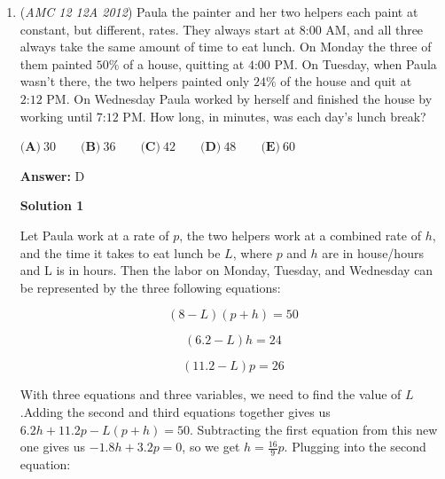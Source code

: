 \begin{enumerate}
 $\frac{-4 + 2\sqrt{19}}{5} \Rightarrow \boxed{\textbf{(D)}}$




\textbf{Solution 3}

Like the previous solutions, we can say that the square is symmetrical with respect to the y-axis.

 \begin{verbatim}
Since CD passes through point (0,1), let C be (-x,1) and D be (x,1)
\end{verbatim}

Point B is $\left(-x, \sqrt{4-x^2}\right)$ and Point A is $\left(x,\sqrt{4-x^2}\right)$. Now, we see that AB = 2x and BC = $\sqrt{4-x^2}$-1

 Setting those two equal, we get the same equation as the previous solutions: $5x^2 +4x -3 = 0$ and then solve the same way.

 
-Conantwiz2023

 


	\item (\textit{AMC 12 12A 2012}) Paula the painter and her two helpers each paint at constant, but different, rates.  They always start at $\text{8:00 AM}$, and all three always take the same amount of time to eat lunch.  On Monday the three of them painted $50\%$ of a house, quitting at $\text{4:00 PM}$.  On Tuesday, when Paula wasn't there, the two helpers painted only $24\%$ of the house and quit at $\text{2:12 PM}$.  On Wednesday Paula worked by herself and finished the house by working until $\text{7:12 PM}$.  How long, in minutes, was each day's lunch break?


 $\textbf{(A)}\ 30 \qquad\textbf{(B)}\ 36 \qquad\textbf{(C)}\ 42 \qquad\textbf{(D)}\ 48 \qquad\textbf{(E)}\ 60$

 \textbf{Answer: }D



\textbf{Solution 1}

Let Paula work at a rate of $p$, the two helpers work at a combined rate of $h$, and the time it takes to eat lunch be $L$, where $p$ and $h$ are in house/hours and L is in hours. Then the labor on Monday, Tuesday, and Wednesday can be represented by the three following equations:

 
 \[(8-L)(p+h)=50\]

 \[(6.2-L)h=24\]

 \[(11.2-L)p=26\]

 With three equations and three variables, we need to find the value of $L$.Adding the second and third equations together gives us $6.2h+11.2p-L(p+h)=50$. Subtracting the first equation from this new one gives us $-1.8h+3.2p=0$, so we get $h=\frac{16}{9}p$. Plugging into the second equation:


\end{enumerate}
